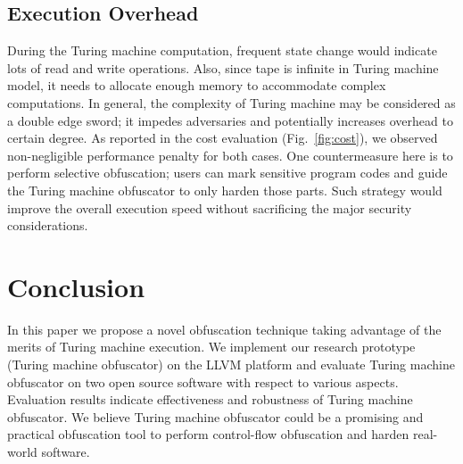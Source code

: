 \documentclass[lnicst]{svmultln}
\begin{document}
\subsection{Execution Overhead}
During the Turing machine computation, frequent state change would indicate lots
of read and write operations. Also, since tape is infinite in Turing machine
model, it needs to allocate enough memory to accommodate complex computations.
In general, the complexity of Turing machine may be considered as a double edge
sword; it impedes adversaries and potentially increases overhead to certain
degree. As reported in the cost evaluation (Fig.~\ref{fig:cost}), we observed
non-negligible performance penalty for both cases. One countermeasure here is to
perform selective obfuscation; users can mark sensitive program codes and guide
the Turing machine obfuscator to only harden those parts. Such strategy would
improve the overall execution speed without sacrificing the major security
considerations.

\section{Conclusion}
In this paper we propose a novel obfuscation technique taking advantage of the
merits of Turing machine execution. We implement our research prototype (Turing
machine obfuscator) on the LLVM platform and evaluate Turing machine obfuscator
on two open source software with respect to various aspects. Evaluation results
indicate effectiveness and robustness of Turing machine obfuscator. We believe
Turing machine obfuscator could be a promising and practical obfuscation tool to
perform control-flow obfuscation and harden real-world software.
\end{document}
